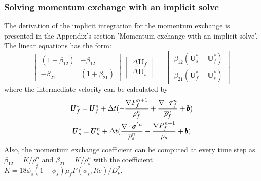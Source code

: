 \documentclass[preprint,12pt]{elsarticle}
\begin{document}
\subsubsection{Solving momentum exchange with an implicit solve}
The derivation of the implicit integration for the momentum exchange is presented in the Appendix's section 'Momentum exchange with an implicit solve'. The linear equations 
has the form:
%
\[ \begin{vmatrix} (1 + \beta_{12})  &  -\beta_{12} \\
                  -\beta_{21}       &  (1 + \beta_{21})
    \end{vmatrix}
    \begin{vmatrix} \Delta \pmb{U}_{f} \\
                    \Delta \pmb{U}_{s}
    \end{vmatrix}
    =
    \begin{vmatrix}  \beta_{12}(\pmb{U}_{s}^{*} - \pmb{U}_{f}^{*}) \\
                    \beta_{21}(\pmb{U}_{f}^{*} - \pmb{U}_{s}^{*})
    \end{vmatrix}                
\]
%
%
where the intermediate velocity can be calculated by
%
\begin{equation}
\begin{gathered}
\pmb{U}_{f}^{*} = \pmb{U}_{f}^{n} + \Delta{t} (-\frac{\nabla P_{f}^{n+1}}{\rho_f^n}  + \frac {\nabla \cdot \pmb{\tau}_f^{n}}{\overline{\rho}^n_{f}} + \pmb{b}) \\
\pmb{U}_{s}^{*} = \pmb{U}_{s}^{n} + \Delta{t} (\frac{\nabla \cdot \pmb{\sigma}^{'n}}{\overline{\rho}^n_{s}}    - \frac{\nabla P_{f}^{n+1}}{\rho_s}  + \pmb{b})
\end{gathered}
\end{equation}
%
%
Also, the momentum exchange coefficient can be computed at every time step as $\beta_{12} = K/\overline{\rho}_{f}^n$ and $\beta_{21} = K/\overline{\rho}_{s}^n$ with the coefficient $K =  18\phi_s(1-\phi_s)\mu_f  F(\phi_s, Re) /D_p^2$.

\end{document}
